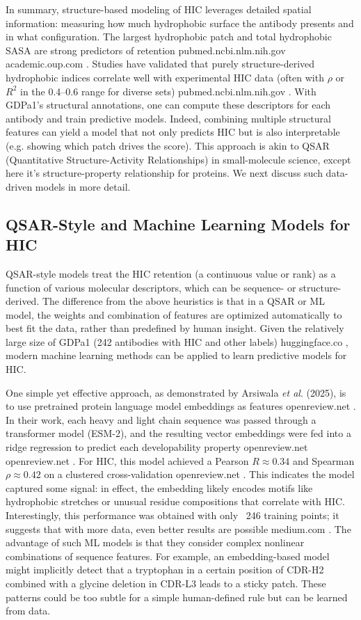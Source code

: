 \documentclass[12pt]{article}
\begin{document}
In summary, structure-based modeling of HIC leverages detailed spatial information: measuring how much hydrophobic surface the antibody presents and in what configuration. The largest hydrophobic patch and total hydrophobic SASA are strong predictors of retention
pubmed.ncbi.nlm.nih.gov
academic.oup.com
. Studies have validated that purely structure-derived hydrophobic indices correlate well with experimental HIC data (often with $\rho$ or $R^2$ in the 0.4–0.6 range for diverse sets)
pubmed.ncbi.nlm.nih.gov
. With GDPa1’s structural annotations, one can compute these descriptors for each antibody and train predictive models. Indeed, combining multiple structural features can yield a model that not only predicts HIC but is also interpretable (e.g. showing which patch drives the score). This approach is akin to QSAR (Quantitative Structure-Activity Relationships) in small-molecule science, except here it’s structure-property relationship for proteins. We next discuss such data-driven models in more detail.

\subsection{QSAR-Style and Machine Learning Models for HIC}
QSAR-style models treat the HIC retention (a continuous value or rank) as a function of various molecular descriptors, which can be sequence- or structure-derived. The difference from the above heuristics is that in a QSAR or ML model, the weights and combination of features are optimized automatically to best fit the data, rather than predefined by human insight. Given the relatively large size of GDPa1 (242 antibodies with HIC and other labels)
huggingface.co
, modern machine learning methods can be applied to learn predictive models for HIC.

One simple yet effective approach, as demonstrated by Arsiwala \textit{et al}. (2025), is to use pretrained protein language model embeddings as features
openreview.net
. In their work, each heavy and light chain sequence was passed through a transformer model (ESM-2), and the resulting vector embeddings were fed into a ridge regression to predict each developability property
openreview.net
openreview.net
. For HIC, this model achieved a Pearson $R\approx0.34$ and Spearman $\rho\approx0.42$ on a clustered cross-validation
openreview.net
. This indicates the model captured some signal: in effect, the embedding likely encodes motifs like hydrophobic stretches or unusual residue compositions that correlate with HIC. Interestingly, this performance was obtained with only ~246 training points; it suggests that with more data, even better results are possible
medium.com
. The advantage of such ML models is that they consider complex nonlinear combinations of sequence features. For example, an embedding-based model might implicitly detect that a tryptophan in a certain position of CDR-H2 combined with a glycine deletion in CDR-L3 leads to a sticky patch. These patterns could be too subtle for a simple human-defined rule but can be learned from data.
\end{document}
